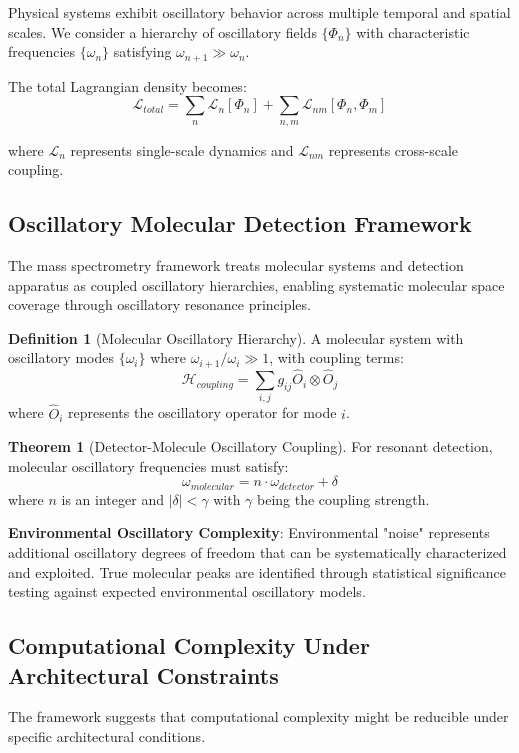 \documentclass[12pt,a4paper]{article}
\theoremstyle{definition}
\newtheorem{definition}{Definition}[section]
\newtheorem{theorem}{Theorem}[section]
\begin{document}
{Physical systems exhibit oscillatory behavior across multiple temporal and spatial scales. We consider a hierarchy of oscillatory fields $\{\Phi_n\}$ with characteristic frequencies $\{\omega_n\}$ satisfying $\omega_{n+1} \gg \omega_n$.

The total Lagrangian density becomes:
$$\mathcal{L}_{total} = \sum_n \mathcal{L}_n[\Phi_n] + \sum_{n,m} \mathcal{L}_{nm}[\Phi_n, \Phi_m]$$

where $\mathcal{L}_n$ represents single-scale dynamics and $\mathcal{L}_{nm}$ represents cross-scale coupling.

\subsection{Oscillatory Molecular Detection Framework}

The mass spectrometry framework treats molecular systems and detection apparatus as coupled oscillatory hierarchies, enabling systematic molecular space coverage through oscillatory resonance principles.

\begin{definition}[Molecular Oscillatory Hierarchy]
A molecular system with oscillatory modes $\{\omega_i\}$ where $\omega_{i+1}/\omega_i \gg 1$, with coupling terms:
$$\mathcal{H}_{coupling} = \sum_{i,j} g_{ij} \hat{O}_i \otimes \hat{O}_j$$
where $\hat{O}_i$ represents the oscillatory operator for mode $i$.
\end{definition}

\begin{theorem}[Detector-Molecule Oscillatory Coupling]
For resonant detection, molecular oscillatory frequencies must satisfy:
$$\omega_{molecular} = n \cdot \omega_{detector} + \delta$$
where $n$ is an integer and $|\delta| < \gamma$ with $\gamma$ being the coupling strength.
\end{theorem}

\textbf{Environmental Oscillatory Complexity}: Environmental "noise" represents additional oscillatory degrees of freedom that can be systematically characterized and exploited. True molecular peaks are identified through statistical significance testing against expected environmental oscillatory models.

\subsection{Computational Complexity Under Architectural Constraints}

The framework suggests that computational complexity might be reducible under specific architectural conditions.

}
\end{document}
